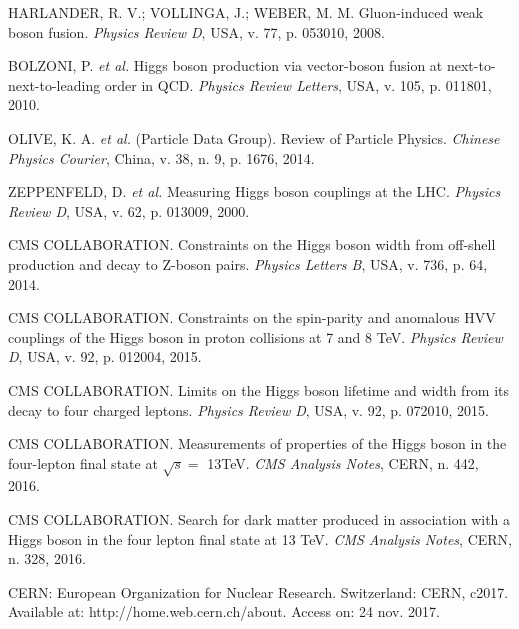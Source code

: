 \begin{thebibliography}{}
HARLANDER, R. V.; VOLLINGA, J.; WEBER, M. M. Gluon-induced weak boson fusion. \textit{Physics Review D}, USA, v. 77, p. 053010, 2008.

BOLZONI, P. \textit{et al.} Higgs boson production via vector-boson fusion at next-to-next-to-leading order in QCD. \textit{Physics Review Letters}, USA, v. 105, p. 011801, 2010.

OLIVE, K. A. \textit{et al.} (Particle Data Group). Review of Particle Physics. \textit{Chinese Physics Courier}, China, v. 38, n. 9, p. 1676, 2014.

ZEPPENFELD, D. \textit{et al.} Measuring Higgs boson couplings at the LHC. \textit{Physics Review D}, USA, v. 62, p. 013009, 2000.

CMS COLLABORATION. Constraints on the Higgs boson width from off-shell production and decay to Z-boson pairs. \textit{Physics Letters B}, USA, v. 736, p. 64, 2014.

CMS COLLABORATION. Constraints on the spin-parity and anomalous HVV couplings of the Higgs boson in proton collisions at 7 and 8 TeV. \textit{Physics Review D}, USA, v. 92, p. 012004, 2015.

CMS COLLABORATION. Limits on the Higgs boson lifetime and width from its decay to four charged leptons. \textit{Physics Review D}, USA, v. 92, p. 072010, 2015.

CMS COLLABORATION. Measurements of properties of the Higgs boson in the four-lepton final state at $\sqrt{s}=$ 13TeV. \textit{CMS Analysis Notes}, CERN, n. 442, 2016.

CMS COLLABORATION. Search for dark matter produced in association with a Higgs boson in the four lepton final state at 13 TeV. \textit{CMS Analysis Notes}, CERN, n. 328, 2016.



CERN: European Organization for Nuclear Research. Switzerland: CERN, c2017. Available at: http://home.web.cern.ch/about. Access on: 24 nov. 2017.


\end{thebibliography}
